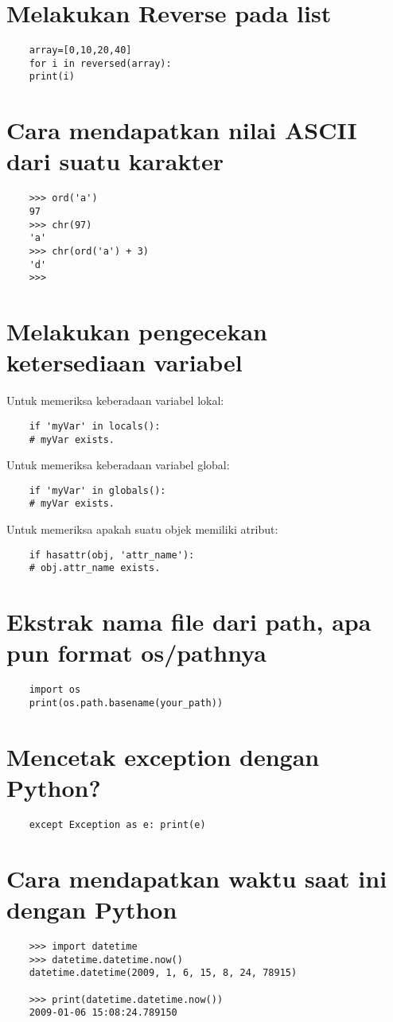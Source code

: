 \documentclass{article}
\begin{document}
\section {Melakukan Reverse pada list}
\begin{lstlisting}
	array=[0,10,20,40]
	for i in reversed(array):
	print(i)
\end{lstlisting}

\section {Cara mendapatkan nilai ASCII dari suatu karakter}
\begin{lstlisting}
	>>> ord('a')
	97
	>>> chr(97)
	'a'
	>>> chr(ord('a') + 3)
	'd'
	>>>
\end{lstlisting}

\section {Melakukan pengecekan ketersediaan variabel}
Untuk memeriksa keberadaan variabel lokal:
\begin{lstlisting}
	if 'myVar' in locals():
	# myVar exists.
\end{lstlisting}
Untuk memeriksa keberadaan variabel global:
\begin{lstlisting}
	if 'myVar' in globals():
	# myVar exists.
\end{lstlisting}
Untuk memeriksa apakah suatu objek memiliki atribut:
\begin{lstlisting}
	if hasattr(obj, 'attr_name'):
	# obj.attr_name exists.
\end{lstlisting}

\section {Ekstrak nama file dari path, apa pun format os/pathnya}
\begin{lstlisting}
	import os
	print(os.path.basename(your_path))
\end{lstlisting}

\section {Mencetak exception dengan Python?}
\begin{lstlisting}
	except Exception as e: print(e)
\end{lstlisting}

\section {Cara mendapatkan waktu saat ini dengan Python}
\begin{lstlisting}
	>>> import datetime
	>>> datetime.datetime.now()
	datetime.datetime(2009, 1, 6, 15, 8, 24, 78915)
	
	>>> print(datetime.datetime.now())
	2009-01-06 15:08:24.789150
\end{lstlisting}
\end{document}
